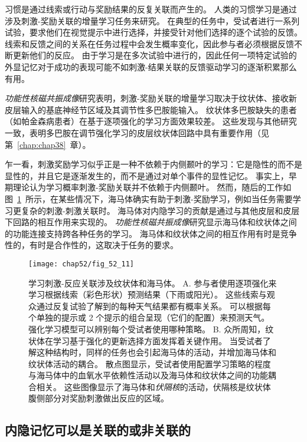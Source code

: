 习惯是通过线索或行动与奖励结果的反复关联而产生的。
人类的习惯学习是通过涉及刺激-奖励关联的增量学习任务来研究。
在典型的任务中，受试者进行一系列试验，要求他们在视觉提示中进行选择，并接受针对他们选择的逐个试验的反馈。
线索和反馈之间的关系在任务过程中会发生概率变化，因此参与者必须根据反馈不断更新他们的反应。
由于学习是在多次试验中进行的，因此任何一项特定试验的外显记忆对于成功的表现可能不如刺激-结果关联的反馈驱动学习的逐渐积累那么有用。


\textit{功能性核磁共振成像}研究表明，刺激-奖励关联的增量学习取决于纹状体、接收新皮层输入的基底神经节区域及其调节性多巴胺能输入。
纹状体多巴胺缺失的患者（如帕金森病患者）在基于逐项强化的学习方面效果较差。
这些发现与其他研究一致，表明多巴胺在调节强化学习的皮层纹状体回路中具有重要作用（见第~\ref{chap:chap38}~章）。


乍一看，刺激奖励学习似乎正是一种不依赖于内侧颞叶的学习：它是隐性的而不是显性的，并且它是逐渐发生的，而不是通过对单个事件的显性记忆。
事实上，早期理论认为学习概率刺激-奖励关联并不依赖于内侧颞叶。
然而，随后的工作如图~\ref{fig:52_11}~所示，在某些情况下，海马体确实有助于刺激-奖励学习，例如当任务需要学习更复杂的刺激-刺激关联时。
海马体对内隐学习的贡献是通过与其他皮层和皮层下回路的相互作用来实现的。
\textit{功能性核磁共振成像}研究显示海马体和纹状体之间的功能连接支持跨各种任务的学习。
海马体和纹状体之间的相互作用有时是竞争性的，有时是合作性的，这取决于任务的要求。


\begin{figure}[htbp]
	\centering
	\texttt{[image: chap52/fig\_52\_11]}
	\caption{学习刺激-反应关联涉及纹状体和海马体\cite{duncan2018more}。
		A. 参与者使用逐项强化来学习根据线索（彩色形状）预测结果（下雨或阳光）。
		这些线索与观众通过反复试验了解到的每种天气结果都有概率关系。
		可以根据每个单独的提示或 2 个提示的组合呈现（它们的配置）来预测天气。
		强化学习模型可以辨别每个受试者使用哪种策略。
		B. 众所周知，纹状体在学习基于强化的更新选择方面发挥着关键作用。
		当受试者了解这种结构时，同样的任务也会引起海马体的活动，并增加海马体和纹状体活动的耦合。
		散点图显示，受试者使用配置学习策略的程度与海马体中的血氧水平依赖性活动以及海马体和纹状体之间的功能耦合相关。
		这些图像显示了海马体和\textit{伏隔核}的活动，伏隔核是纹状体腹侧部分对奖励刺激做出反应的区域。}
	\label{fig:52_11}
\end{figure}



\subsection{内隐记忆可以是关联的或非关联的}

